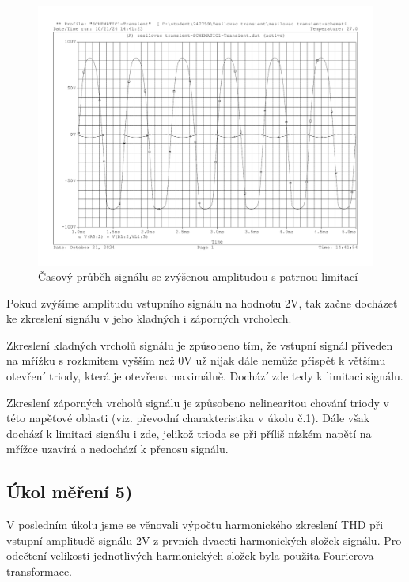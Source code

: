 \documentclass[a4paper, czech]{article}
\begin{document}
\begin{figure}[H]
    \centering
    \includegraphics[width=\textwidth]{charakteristiky/uloha4_2v.pdf}
    \caption{Časový průběh signálu se zvýšenou amplitudou s patrnou limitací}
\end{figure}

Pokud zvýšíme amplitudu vstupního signálu na hodnotu 2V, tak začne docházet ke zkreslení signálu v jeho kladných i záporných vrcholech.

Zkreslení kladných vrcholů signálu je způsobeno tím, že vstupní signál přiveden na mřížku s rozkmitem vyšším než 0V už nijak dále nemůže přispět k většímu otevření triody, která je otevřena maximálně.
Dochází zde tedy k limitaci signálu.

Zkreslení záporných vrcholů signálu je způsobeno nelinearitou chování triody v této napěťové oblasti (viz. převodní charakteristika v úkolu č.1).
Dále však dochází k limitaci signálu i zde, jelikož trioda se při příliš nízkém napětí na mřížce uzavírá a nedochází k přenosu signálu.

\pagebreak

\subsection{Úkol měření 5)}

V posledním úkolu jsme se věnovali výpočtu harmonického zkreslení THD při vstupní amplitudě signálu 2V z prvních dvaceti harmonických složek signálu.
Pro odečtení velikosti jednotlivých harmonických složek byla použita Fourierova transformace.
\end{document}
